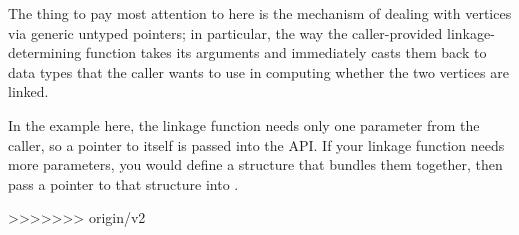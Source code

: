 The thing to pay most attention to here is the mechanism of dealing
with vertices via generic untyped pointers; in particular, the way the
caller-provided linkage-determining function takes its 
arguments and immediately casts them back to data types that the
caller wants to use in computing whether the two vertices are linked.

In the example here, the linkage function needs only one parameter
from the caller, so a pointer to  itself is passed
into the API. If your linkage function needs more parameters, you
would define a structure that bundles them together, then pass a
pointer to that structure into .

>>>>>>> origin/v2

